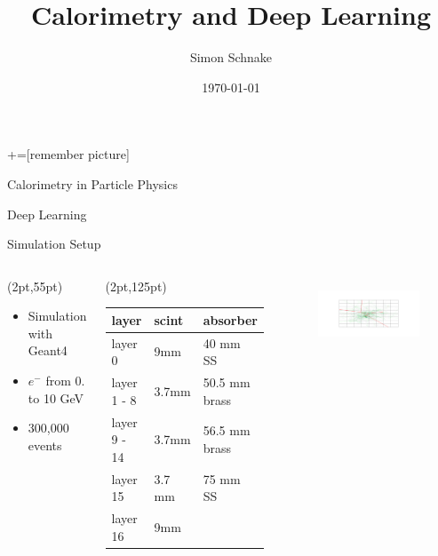 \documentclass[10pt]{beamer}
\title{Calorimetry and Deep Learning}
\date{\today}
\author{Simon Schnake}
\institute{Universität Hamburg}
\begin{document}
\maketitle
{}+=[remember picture]
\begin{frame}{Calorimetry in Particle Physics}

\end{frame}

\begin{frame}{Deep Learning}

\end{frame}

\begin{frame}{Simulation Setup}
  \begin{columns}
    \begin{textblock*}{150pt}(2pt,55pt)
      \begin{itemize}
      \item Simulation with Geant4\small{}
      \item $e^-$ from 0. to 10 GeV
      \item 300,000 events
      \end{itemize}
    \end{textblock*}
    \begin{textblock*}{10pt}(2pt,125pt)
      \begin{tabular}{l|l|l}
        layer  & scint    & absorber \\ \hline
        layer 0      & 9mm     & 40 mm SS\\
        layer 1 - 8  & 3.7mm   & 50.5 mm brass        \\
        layer 9 - 14 & 3.7mm   & 56.5 mm brass         \\
        layer 15     & 3.7 mm  & 75 mm SS \\
        layer 16     & 9mm     &                      
      \end{tabular}
    \end{textblock*}
    \begin{figure}[htp]
      \includegraphics[width=1.1\textwidth]{front.png}\\

\end{figure}
\end{columns}
\end{frame}
\end{document}
